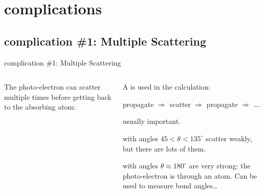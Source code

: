\section{{\feff} complications}

\subsection{{\feff} complication \#1: Multiple Scattering}

\begin{slide}{{\feff} complication \#1: Multiple Scattering}

  \begin{cenpage}{135mm}

  \vmm
\begin{columns}
  \begin{column}{50mm}
  The photo-electron can scatter multiple times before getting back to the
  absorbing atom:

  \begin{center}
  \end{center}

  \end{column}
  \begin{column}{60mm}

  A {} is used in the  calculation:

  \begin{center}
    propagate $\Rightarrow$ scatter $\Rightarrow$ propagate $\Rightarrow$ \ldots.
  \end{center}

  \vmm
    usually important.

   with angles $ 45 < \theta <
  135^{\circ}$ scatter weakly, but there are lots of them.

   with angles $\theta \approx 180^{\circ}$
   are very strong: the photo-electron is {} through an atom.
   Can be used to measure bond angles\ldots

  \end{column}
  \end{columns}

   \begin{postitbox}{92mm}
   \end{postitbox}
\end{cenpage}  \end{slide}


